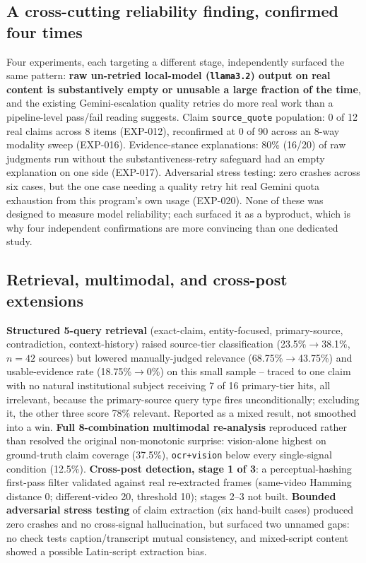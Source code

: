 \documentclass[conference]{IEEEtran}
\begin{document}
\subsection{A cross-cutting reliability finding, confirmed four times}
\label{sec:reliabilityfinding}
Four experiments, each targeting a different stage, independently
surfaced the same pattern: \textbf{raw un-retried local-model
(\texttt{llama3.2}) output on real content is substantively empty or
unusable a large fraction of the time}, and the existing
Gemini-escalation quality retries do more real work than a
pipeline-level pass/fail reading suggests. Claim \texttt{source\_quote}
population: 0 of 12 real claims across 8 items (EXP-012), reconfirmed at
0 of 90 across an 8-way modality sweep (EXP-016). Evidence-stance
explanations: 80\% (16/20) of raw judgments run without the
substantiveness-retry safeguard had an empty explanation on one side
(EXP-017). Adversarial stress testing: zero crashes across six cases,
but the one case needing a quality retry hit real Gemini quota
exhaustion from this program's own usage (EXP-020). None of these was
designed to measure model reliability; each surfaced it as a byproduct,
which is why four independent confirmations are more convincing than one
dedicated study.

\subsection{Retrieval, multimodal, and cross-post extensions}
\label{sec:foundationmultimodal}
\label{sec:foundationadversarial}
\textbf{Structured 5-query retrieval} (exact-claim, entity-focused,
primary-source, contradiction, context-history) raised source-tier
classification (23.5\%$\to$38.1\%, $n=42$ sources) but lowered
manually-judged relevance (68.75\%$\to$43.75\%) and usable-evidence
rate (18.75\%$\to$0\%) on this small sample -- traced to one claim with
no natural institutional subject receiving 7 of 16 primary-tier hits,
all irrelevant, because the primary-source query type fires
unconditionally; excluding it, the other three score 78\% relevant.
Reported as a mixed result, not smoothed into a win. \textbf{Full
8-combination multimodal re-analysis} reproduced rather than resolved
the original non-monotonic surprise: vision-alone highest on
ground-truth claim coverage (37.5\%), \texttt{ocr+vision} below every
single-signal condition (12.5\%). \textbf{Cross-post detection, stage 1
of 3}: a perceptual-hashing first-pass filter validated against real
re-extracted frames (same-video Hamming distance 0; different-video 20,
threshold 10); stages 2--3 not built. \textbf{Bounded adversarial stress
testing} of claim extraction (six hand-built cases) produced zero
crashes and no cross-signal hallucination, but surfaced two unnamed
gaps: no check tests caption/transcript mutual consistency, and
mixed-script content showed a possible Latin-script extraction bias.
\end{document}
